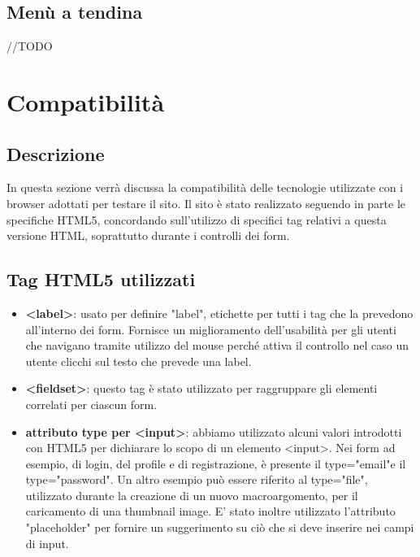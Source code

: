 \documentclass[12pt]{article}
\begin{document}
	\subsection{Menù a tendina}
	//TODO
	\section{Compatibilità}
	\subsection{Descrizione}
	In questa sezione verrà discussa la compatibilità delle tecnologie utilizzate con i browser adottati per testare il sito. Il sito è stato realizzato seguendo in parte le specifiche HTML5, concordando sull'utilizzo  di specifici tag relativi a questa versione HTML, soprattutto durante i controlli dei form.
	\subsection{Tag HTML5 utilizzati}
	\begin{itemize}
		\item \textbf{<label>}: usato per definire "label", etichette per tutti i tag che la prevedono all'interno dei form. Fornisce un miglioramento dell'usabilità per gli utenti che navigano tramite utilizzo del mouse perché attiva il controllo nel caso un utente clicchi sul testo che prevede una label.
		\item \textbf{<fieldset>}: questo tag è stato utilizzato per raggruppare gli elementi correlati per ciascun form.
		\item \textbf{attributo type per <input>}: abbiamo utilizzato alcuni valori introdotti con HTML5 per dichiarare lo scopo di un elemento <input>. Nei form ad esempio, di login, del profile e di registrazione, è presente il type="email"e il type="password". Un altro esempio può essere riferito al type="file", utilizzato durante la creazione di un nuovo macroargomento, per il caricamento di una thumbnail image.
		E' stato inoltre utilizzato l'attributo "placeholder" per fornire un suggerimento su ciò che si deve inserire nei campi di input.
	\end{itemize}
\end{document}
